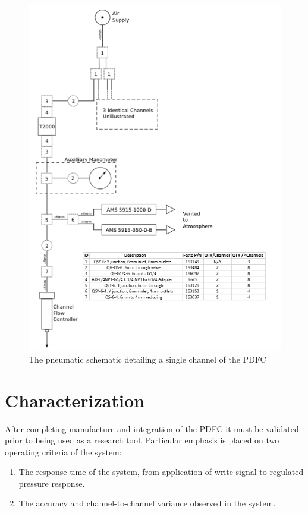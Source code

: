 \begin{figure}[H]
\centering 
\includegraphics[width=01.0\columnwidth]{pneumaticSchematic.PNG} 
\caption[Pneumatic Schematic of PDFC channel]{The pneumatic schematic detailing a single channel of the PDFC} 
\label{fig:pneumaticSchematic} 
\end{figure}

\section{Characterization}


After completing manufacture and integration of the PDFC it must be validated prior to being used as a research tool. Particular emphasis is placed on two operating criteria of the system:
\begin{enumerate}
\item The response time of the system, from application of write signal to regulated pressure response.
\item The accuracy and channel-to-channel variance observed in the system.
\end{enumerate}

